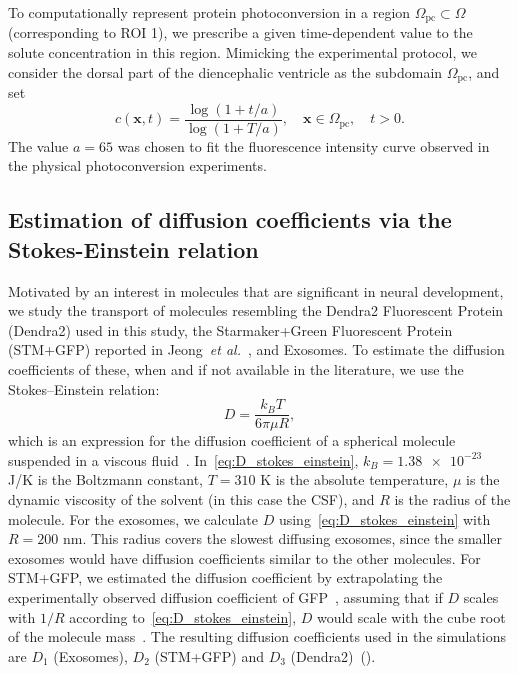 \documentclass[fleqn]{wlscirep}
\newcommand{\xx}{\bm{x}}
\begin{document}
To computationally represent protein photoconversion in a region
$\Omega_{\mathrm{pc}} \subset \Omega$ (corresponding to ROI 1),
we prescribe a given time-dependent value to the solute concentration in this region. 
Mimicking the experimental protocol, we consider the dorsal part of the
diencephalic ventricle as the subdomain $\Omega_{\mathrm{pc}}$, and set
\begin{equation}
  c(\xx, t)=\frac{\log{(1+t/a)}}{\log{(1+T/a)}},
  \quad \xx \in \Omega_{\mathrm{pc}}, \quad t > 0.
\label{eq:photoconversion_curve}
\end{equation}
The value $a=65$ was chosen to fit the fluorescence intensity curve
observed in the physical photoconversion experiments.

\subsection*{Estimation of diffusion coefficients via the Stokes-Einstein relation}
Motivated by an interest in molecules that are significant in neural development,
we study the transport of molecules resembling the Dendra2 Fluorescent Protein (Dendra2)
used in this study, the Starmaker+Green Fluorescent Protein (STM+GFP) reported in
Jeong~\emph{et al.}~\cite{Jeong2024TheZebrafish}, and Exosomes.
To estimate the diffusion coefficients of these, when and if not
available in the literature, we use the Stokes--Einstein relation:
\begin{equation}
    D = \frac{k_B T}{6\pi \mu R},
    \label{eq:D_stokes_einstein}
\end{equation}
which is an expression for the diffusion coefficient of a spherical
molecule suspended in a viscous fluid~\cite{Einstein1905UberTeilchen}.
In~\eqref{eq:D_stokes_einstein}, $k_B = \num{1.38e-23}$ J/K is the Boltzmann constant,
$T = 310$ K is the absolute temperature, $\mu$ is the dynamic viscosity of the
solvent (in this case the CSF), and $R$ is the radius of the molecule.
For the exosomes, we calculate $D$ using~\eqref{eq:D_stokes_einstein}
with $R=200$ nm. This radius covers the slowest diffusing exosomes,
since the smaller exosomes would have diffusion coefficients similar to the other molecules.
For STM+GFP, we estimated the diffusion coefficient by extrapolating
the experimentally observed diffusion coefficient of
GFP~\cite{Swaminathan1997PhotobleachingDiffusion, Potma2001ReducedCells},
assuming that if $D$ scales with $1/R$ according to~\eqref{eq:D_stokes_einstein},
$D$ would scale with the cube root of the molecule mass~\cite{Goodhill1997DiffusionGuidance}.
The resulting diffusion coefficients used in the simulations
are $D_1$ (Exosomes), $D_2$ (STM+GFP) and $D_3$ (Dendra2)~().
\end{document}
